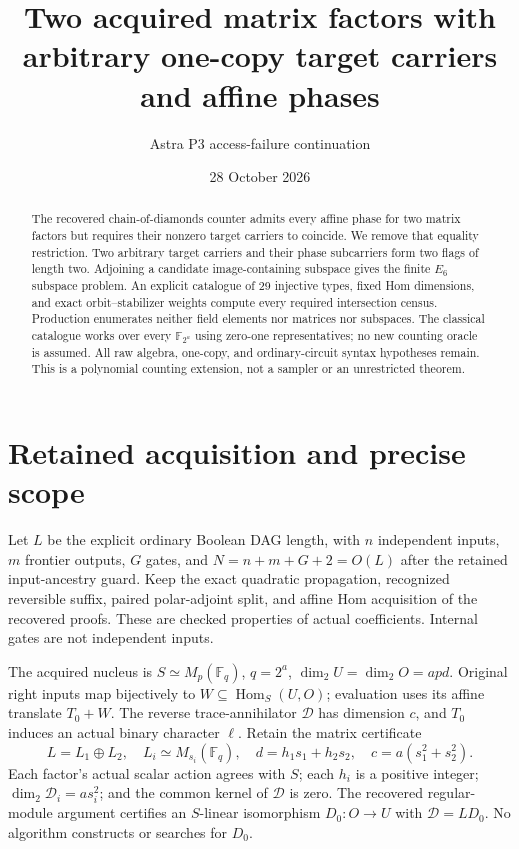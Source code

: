 \documentclass[11pt]{article}
\title{Two acquired matrix factors with arbitrary one-copy target carriers and affine phases}
\author{Astra P3 access-failure continuation}\date{28 October 2026}
\newcommand{\F}{\mathbb F}\newcommand{\Hom}{\operatorname{Hom}}
\begin{document}
\maketitle
\begin{abstract}
The recovered chain-of-diamonds counter admits every affine phase for two
matrix factors but requires their nonzero target carriers to coincide.
We remove that equality restriction. Two arbitrary target carriers and
their phase subcarriers form two flags of length two. Adjoining a candidate
image-containing subspace gives the finite $E_6$ subspace problem. An
explicit catalogue of 29 injective types, fixed Hom dimensions, and exact
orbit--stabilizer weights compute every required intersection census.
Production enumerates neither field elements nor matrices nor subspaces.
The classical catalogue works over every $\F_{2^a}$ using zero-one
representatives; no new counting oracle is assumed. All raw algebra,
one-copy, and ordinary-circuit syntax hypotheses remain. This is a
polynomial counting extension, not a sampler or an unrestricted theorem.
\end{abstract}

\section{Retained acquisition and precise scope}
Let $L$ be the explicit ordinary Boolean DAG length, with $n$ independent
inputs, $m$ frontier outputs, $G$ gates, and $N=n+m+G+2=O(L)$ after the
retained input-ancestry guard. Keep the exact quadratic propagation,
recognized reversible suffix, paired polar-adjoint split, and affine Hom
acquisition of the recovered proofs. These are checked properties of
actual coefficients. Internal gates are not independent inputs.

The acquired nucleus is $S\simeq M_p(\F_q)$, $q=2^a$,
$\dim_2U=\dim_2O=apd$. Original right inputs map bijectively to
$W\subseteq\Hom_S(U,O)$; evaluation uses its affine translate $T_0+W$.
The reverse trace-annihilator $\mathcal D$ has dimension $c$, and $T_0$
induces an actual binary character $\ell$. Retain the matrix certificate
\[
 L=L_1\oplus L_2,\quad L_i\simeq M_{s_i}(\F_q),\quad
 d=h_1s_1+h_2s_2,\quad c=a(s_1^2+s_2^2).
\]
Each factor's actual scalar action agrees with $S$; each $h_i$ is a
positive integer; $\dim_2\mathcal D_i=as_i^2$; and the common kernel
of $\mathcal D$ is zero. The recovered regular-module argument certifies
an $S$-linear isomorphism $D_0:O\to U$ with $\mathcal D=LD_0$.
No algorithm constructs or searches for $D_0$.
\end{document}

